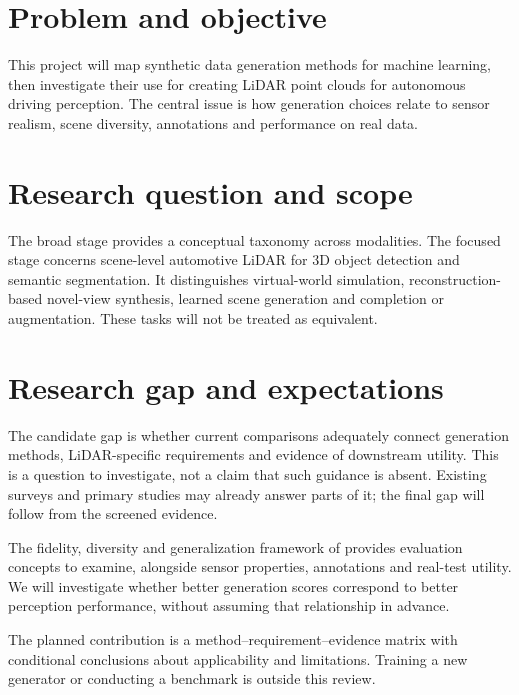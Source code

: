 \section{Problem and objective}
This project will map synthetic data generation methods for machine learning,
then investigate their use for creating LiDAR point clouds for autonomous
driving perception. The central issue is how generation choices relate to
sensor realism, scene diversity, annotations and performance on real data.

\section{Research question and scope}

The broad stage provides a conceptual taxonomy across modalities. The
focused stage concerns scene-level automotive LiDAR for 3D object detection
and semantic segmentation. It distinguishes virtual-world simulation,
reconstruction-based novel-view synthesis, learned scene generation and
completion or augmentation. These tasks will not be treated as equivalent.

\section{Research gap and expectations}
The candidate gap is whether current comparisons adequately connect
generation methods, LiDAR-specific requirements and evidence of downstream
utility. This is a question to investigate, not a claim that such guidance
is absent. Existing surveys and primary studies may already answer parts
of it; the final gap will follow from the screened evidence.

The fidelity, diversity and generalization framework of
\textcite{alaaHowFaithfulYour2022} provides evaluation concepts to examine,
alongside sensor properties, annotations and real-test utility. We will
investigate whether better generation scores correspond to better
perception performance, without assuming that relationship in advance.

The planned contribution is a method--requirement--evidence matrix with
conditional conclusions about applicability and limitations.
Training a new generator or conducting a benchmark is outside this review.
